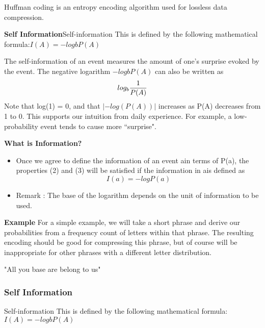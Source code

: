 {%


{
Huffman coding is an entropy encoding algorithm used for lossless data compression.


}

\noindent \textbf{Self Information}Self-information
This is defined by the following mathematical formula:$I(A) = −logb P(A)$

The self-information of an event measures the amount of one's surprise
evoked by the event. The negative logarithm $−logb P(A)$ can also be written as \[
log_b  {1 \over P(A)} \]
Note that log(1) = 0, and that $| − log(P(A))|$ increases as P(A) decreases
from 1 to 0. This supports our intuition from daily experience. For example,
a low-probability event tends to cause more ``surprise".





{
\noindent \textbf{What is Information?}
\begin{itemize} \item Once we agree to define the information of an event ain terms of P(a), the properties (2) and (3) will be satisfied if the information in ais defined as
\[ I(a) = -log P(a)\]

\item Remark : The base of the logarithm depends on the unit of information to be used.
\end{itemize}
}




{
\noindent \textbf{Example}
For a simple example, we will take a short phrase and derive our probabilities from a frequency count of letters within that phrase. The resulting encoding should be good for compressing this phrase, but of course will be inappropriate for other phrases with a different letter distribution.

"All you base are belong to us"
}

\begin{frame} %
\frametitle{Self Information}Self-information
This is defined by the following mathematical formula:$I(A) = −logb P(A)$


\end{frame}}
